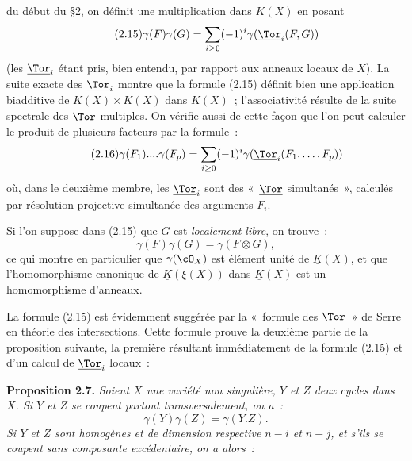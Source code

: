 du début du \S 2, on
définit une multiplication dans $\underline{K}(X)$ en posant
\begin{equation}\tag{2.15}
 \gamma(F)\gamma(G)=\sum_{i\geq0}(-1)^i\gamma(\underline{\Tor}_i(F,G))
\end{equation}
(les $\underline{\Tor}_i$ étant pris, bien entendu, par rapport aux anneaux locaux de $X$). La suite exacte des $\underline{\Tor}_i$ montre que la formule (2.15) définit bien une application biadditive de $\underline{K}(X)\times\underline{K}(X)$ dans $\underline{K}(X)$~; l'associativité résulte de la suite spectrale des $\Tor$ multiples. On vérifie aussi de cette façon que l'on peut calculer le produit de plusieurs facteurs par la formule~:
\begin{equation}\tag{2.16}
 \gamma(F_1)....\gamma(F_p)=\sum_{i\geq0}(-1)^i\gamma(\underline{\Tor}_i(F_1,\ldots,F_p))
\end{equation}
où, dans le deuxième membre, les $\underline{\Tor}_i$ sont des «~$\underline{\Tor}$ simultanés~», calculés par résolution projective simultanée des arguments $F_i$.

Si l'on suppose dans (2.15) que $G$ est \emph{localement libre}, on trouve~:
\begin{equation}\tag{2.15 bis}
 \gamma(F)\gamma(G)=\gamma(F\otimes G),
\end{equation}
ce qui montre en particulier que $\gamma(\cO_X)$ est élément unité de $\underline{K}(X)$, et que l'homomorphisme canonique de $\underline{K}(\xi(X))$ dans $\underline{K}(X)$ est un homomorphisme d'anneaux.

La formule (2.15) est évidemment suggérée par la «~formule des $\Tor$~» de Serre en théorie des intersections. Cette formule prouve la deuxième partie de la proposition suivante, la première résultant immédiatement de la formule (2.15) et d'un calcul de $\underline{\Tor}_i$ locaux~:

\textbf{Proposition 2.7.} \emph{Soient $X$ une variété non singulière, $Y$ et $Z$ deux cycles dans $X$. Si $Y$ et $Z$ se coupent partout transversalement, on a~:}
\begin{equation}\tag{2.17}
 \gamma(Y)\gamma(Z)=\gamma(Y.Z).
\end{equation}
\emph{Si $Y$ et $Z$ sont homogènes et de dimension respective $n-i$ et $n-j$, et s'ils se coupent sans composante excédentaire, on a alors~:}

